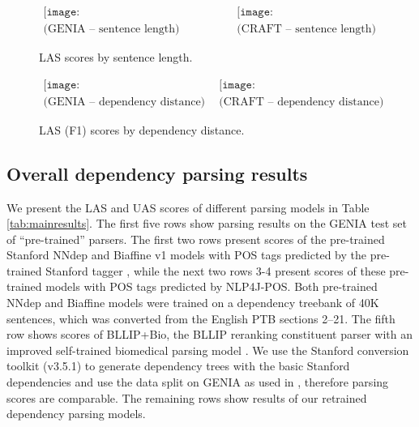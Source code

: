 \documentclass[twocolumn,hyperref]{bmcart}\pdfoutput=1
\begin{document}
\begin{figure*}[!t]
\centering
$\begin{array}{ll}
\texttt{[image: GENIA\_LAS\_BySentenceLength\_1.pdf]} &
\texttt{[image: CRAFT\_LAS\_BySentenceLength\_1.pdf]} 
\\
\mbox{({GENIA -- sentence length})} & \mbox{({CRAFT -- sentence length})}
\end{array}$
\caption{LAS scores by sentence length.}
\label{fig:LASbyLength}
\end{figure*}

\begin{figure*}[!t]
\centering
$\begin{array}{ll}
\texttt{[image: GENIA\_LAS\_ByDepDistance\_1.pdf]} &
\texttt{[image: CRAFT\_LAS\_ByDepDistance\_1.pdf]} 
\\
\mbox{({GENIA -- dependency distance})} & \mbox{({CRAFT -- dependency distance})}
\end{array}$
\caption{LAS (F1) scores by dependency distance.}
\label{fig:LASbyDistance}
\end{figure*}


\subsection*{Overall dependency parsing results}

We present the LAS and UAS scores of different parsing models in Table \ref{tab:mainresults}. 
{The first five rows show parsing results on the GENIA test set of ``pre-trained'' parsers. 
The first two rows  present scores of the pre-trained   Stanford NNdep and Biaffine v1  models  with POS tags predicted by the pre-trained Stanford tagger \cite{Toutanova:2003:FPT:1073445.1073478}, while  the next two rows 3-4 present scores of    these pre-trained models     with POS tags predicted by NLP4J-POS.} Both pre-trained NNdep and Biaffine models were trained on a dependency treebank of 40K sentences, which was 
 converted from the English PTB sections 2--21. 
{The fifth row shows  scores of BLLIP+Bio, the BLLIP reranking constituent parser \cite{charniak-johnson:2005:ACL} with an improved self-trained biomedical parsing model \cite{david2010}.}  
We use the Stanford conversion toolkit (v3.5.1) to generate dependency trees with the basic Stanford dependencies  
and use the data split on GENIA as  used in \cite{david2010}, therefore  parsing scores are comparable.  
The remaining rows show results  of our retrained dependency parsing models. 
\end{document}
